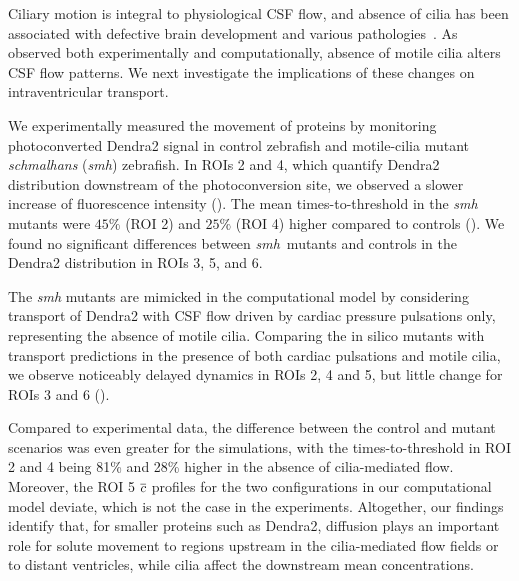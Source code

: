 \documentclass{WileyMSP-template}
\begin{document}
Ciliary motion is integral to physiological CSF flow,
and absence of cilia has been associated with defective
brain development and various pathologies~\cite{Eichele2020Cilia-drivenVentricle,
Olstad2019CiliaryDevelopment, Faubel2016Cilia-basedVentricles,
Guirao2010CouplingCilia, Afzelius2004CiliaRelatedDiseases,
Sawamoto2006NewBrain, Yoshiba2014RolesSymmetry,
Hirokawa2006NodalAsymmetry}.
As observed both experimentally and computationally,
absence of motile cilia alters CSF flow patterns. 
We next investigate the implications of these changes on intraventricular
transport.

We experimentally measured the movement of proteins by monitoring
photoconverted Dendra2 signal in control zebrafish and 
motile-cilia mutant \emph{schmalhans} (\emph{smh}) zebrafish.
In ROIs 2 and 4, which quantify Dendra2 distribution
downstream of the photoconversion site, we observed a slower increase
of fluorescence intensity (). The mean times-to-threshold
in the \emph{smh} mutants were $45\%$ (ROI 2) and $25\%$ (ROI 4) higher
compared to controls (). We found no significant differences
between \emph{smh} mutants and controls
in the Dendra2 distribution in ROIs 3, 5, and 6.

The \emph{smh} mutants are mimicked in the computational model by
considering transport of Dendra2 with CSF flow driven by cardiac
pressure pulsations only, representing the absence of motile
cilia. Comparing the in silico mutants with transport predictions in
the presence of both cardiac pulsations and motile cilia, we observe
noticeably delayed dynamics in ROIs 2, 4 and 5, but little change for
ROIs 3 and 6 ().

Compared to experimental data, the difference between the control and
mutant scenarios was even greater for the simulations, with the
times-to-threshold in ROI 2 and 4 being 81\% and 28\% higher in the
absence of cilia-mediated flow. Moreover, the ROI 5 $\overline{c}$ profiles
for the two configurations in our computational model deviate,
which is not the case in the experiments. Altogether,
our findings identify that, for smaller proteins such as Dendra2,
diffusion plays an important role for
solute movement to regions upstream in the cilia-mediated flow fields or to
distant ventricles, while cilia affect the downstream mean concentrations.
\end{document}
